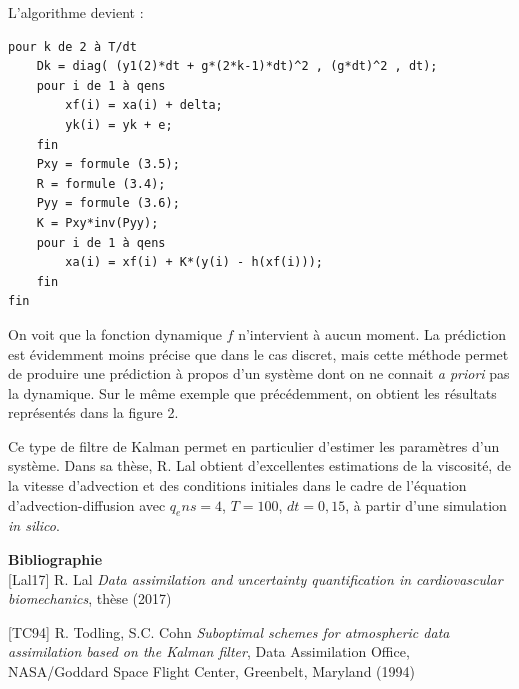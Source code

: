 \documentclass[a4paper]{article}
\newcounter{c}
\newcounter{d}
\newcounter{r}
\newcounter{e}
\newcommand{\chapitre}[1]{\stepcounter{c}\setcounter{e}{0}\setcounter{d}{0}\setcounter{r}{0}\noindent\textbf{\Large#1}\\}
\newcommand{\saut}{\vspace{0.5em}}
\begin{document}
L'algorithme devient :

\begin{verbatim}
pour k de 2 à T/dt
    Dk = diag( (y1(2)*dt + g*(2*k-1)*dt)^2 , (g*dt)^2 , dt);
    pour i de 1 à qens
        xf(i) = xa(i) + delta;
        yk(i) = yk + e;
    fin
    Pxy = formule (3.5);
    R = formule (3.4);
    Pyy = formule (3.6);
    K = Pxy*inv(Pyy);
    pour i de 1 à qens
        xa(i) = xf(i) + K*(y(i) - h(xf(i)));
    fin
fin

\end{verbatim}


On voit que la fonction dynamique $f$ n'intervient à aucun moment. La prédiction est évidemment moins précise que dans le cas discret, mais cette méthode permet de produire une prédiction à propos d'un système dont on ne connait \emph{a priori} pas la dynamique. Sur le même exemple que précédemment, on obtient les résultats représentés dans la figure 2.


Ce type de filtre de Kalman permet en particulier d'estimer les paramètres d'un système. Dans sa thèse, R. Lal obtient d'excellentes estimations de la viscosité, de la vitesse d'advection et des conditions initiales dans le cadre de l'équation d'advection-diffusion avec $q_ens = 4$, $T=100$, $dt=0,15$, à partir d'une simulation \emph{in silico}.

\saut
\saut
\chapitre{Bibliographie}

[Lal17] R. Lal \emph{Data assimilation and uncertainty quantification in cardiovascular biomechanics}, thèse (2017)


[TC94] R. Todling, S.C. Cohn \emph{Suboptimal schemes for atmospheric data assimilation based on the Kalman filter}, Data Assimilation Office, NASA/Goddard Space Flight Center, Greenbelt, Maryland (1994)
\end{document}
